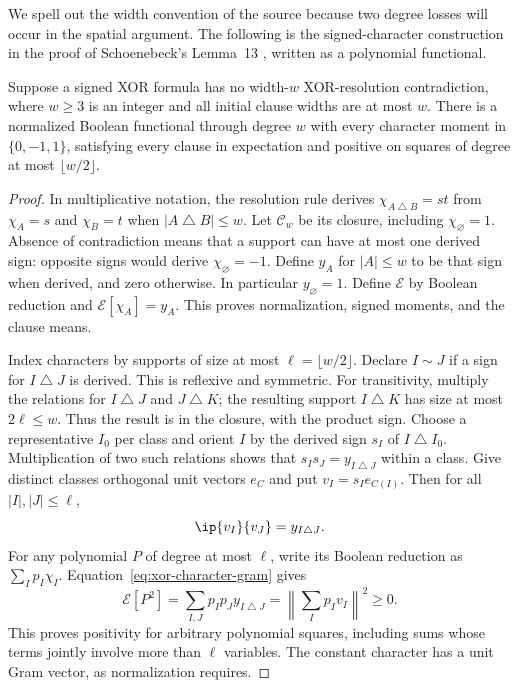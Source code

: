 We spell out the width convention of the source because two degree losses
will occur in the spatial argument. The following is the signed-character
construction in the proof of Schoenebeck's Lemma~13
\citep[Theorems 11--12 and Lemma 13]{Schoenebeck2008}, written as a
polynomial functional.

\begin{lemma}\label{lem:xor-width-moments}
Suppose a signed XOR formula has no width-$w$ XOR-resolution contradiction,
where $w\ge3$ is an integer and all initial clause widths are at most $w$.
There is a normalized Boolean functional through degree $w$ with every
character moment in $\{0,-1,1\}$, satisfying every clause in expectation
and positive on squares of degree at most $\lfloor w/2\rfloor$.
\end{lemma}
\begin{proof}
In multiplicative notation, the resolution rule derives
$\chi_{A\mathbin\triangle B}=st$ from $\chi_A=s$ and $\chi_B=t$
when $|A\mathbin\triangle B|\le w$. Let $\mathcal C_w$ be its closure,
including $\chi_\varnothing=1$. Absence of contradiction means that a
support can have at most one derived sign: opposite signs would derive
$\chi_\varnothing=-1$. Define $y_A$ for $|A|\le w$ to be that sign
when derived, and zero otherwise. In particular $y_\varnothing=1$.
Define $\mathcal E$ by Boolean reduction and $\mathcal E[\chi_A]=y_A$.
This proves normalization, signed moments, and the clause means.

Index characters by supports of size at most $\ell=\lfloor w/2\rfloor$.
Declare $I\sim J$ if a sign for $I\mathbin\triangle J$ is derived.
This is reflexive and symmetric. For transitivity, multiply the relations
for $I\mathbin\triangle J$ and $J\mathbin\triangle K$; the resulting
support $I\mathbin\triangle K$ has size at most $2\ell\le w$.
Thus the result is in the closure, with the product sign. Choose a
representative $I_0$ per class and orient $I$ by the derived sign
$s_I$ of $I\mathbin\triangle I_0$. Multiplication of two such relations
shows that $s_Is_J=y_{I\mathbin\triangle J}$ within a class. Give
distinct classes orthogonal unit vectors $e_C$ and put $v_I=s_Ie_{C(I)}$.
Then for all $|I|,|J|\le\ell$,
\begin{equation}\label{eq:xor-character-gram}
 \ip{v_I}{v_J}=y_{I\mathbin\triangle J}.
\end{equation}
For any polynomial $P$ of degree at most $\ell$, write its Boolean
reduction as $\sum_I p_I\chi_I$. Equation~\eqref{eq:xor-character-gram}
gives
\[
 \mathcal E[P^2]=\sum_{I,J}p_Ip_Jy_{I\mathbin\triangle J}
              =\left\|\sum_Ip_Iv_I\right\|^2\ge0.
\]
This proves positivity for arbitrary polynomial squares, including sums
whose terms jointly involve more than $\ell$ variables. The constant
character has a unit Gram vector, as normalization requires.
\end{proof}

